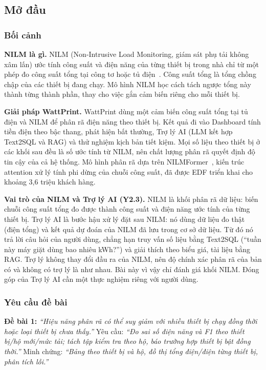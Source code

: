\subsection{Mở đầu}

\subsubsection{Bối cảnh}

\textbf{NILM là gì.} NILM (Non-Intrusive Load Monitoring, giám sát phụ tải không xâm lấn) ước tính công suất và điện năng của từng thiết bị trong nhà chỉ từ một phép đo công suất tổng tại công tơ hoặc tủ điện~\citep{hart1992,zoha2012}. Công suất tổng là tổng chồng chập của các thiết bị đang chạy. Mô hình NILM học cách tách ngược tổng này thành từng thành phần, thay cho việc gắn cảm biến riêng cho mỗi thiết bị.

\textbf{Giải pháp WattPrint.} WattPrint dùng một cảm biến công suất tổng tại tủ điện và NILM để phân rã điện năng theo thiết bị. Kết quả đi vào Dashboard tính tiền điện theo bậc thang, phát hiện bất thường, Trợ lý AI (LLM kết hợp Text2SQL và RAG) và thử nghiệm kịch bản tiết kiệm. Mọi số liệu theo thiết bị ở các khối sau đều là số ước tính từ NILM, nên chất lượng phân rã quyết định độ tin cậy của cả hệ thống. Mô hình phân rã dựa trên NILMFormer~\citep{petralia2025}, kiến trúc attention xử lý tính phi dừng của chuỗi công suất, đã được EDF triển khai cho khoảng 3,6 triệu khách hàng.

\textbf{Vai trò của NILM và Trợ lý AI (Y2.3).} NILM là khối phân rã dữ liệu: biến chuỗi công suất tổng đo được thành công suất và điện năng ước tính của từng thiết bị. Trợ lý AI là bước hậu xử lý đặt sau NILM: nó dùng dữ liệu đo thật (điện tổng) và kết quả dự đoán của NILM đã lưu trong cơ sở dữ liệu. Từ đó nó trả lời câu hỏi của người dùng, chẳng hạn truy vấn số liệu bằng Text2SQL (“tuần này máy giặt dùng bao nhiêu kWh?”) và giải thích theo biểu giá, tài liệu bằng RAG. Trợ lý không thay đổi đầu ra của NILM, nên độ chính xác phân rã của bản có và không có trợ lý là như nhau. Bài này vì vậy chỉ đánh giá khối NILM. Đóng góp của Trợ lý AI cần một thực nghiệm riêng với người dùng.

\subsubsection{Yêu cầu đề bài}

\textbf{Đề bài 1:} \textit{“Hiệu năng phân rã có thể suy giảm với nhiều thiết bị chạy đồng thời hoặc loại thiết bị chưa thấy.”} Yêu cầu: \textit{“Đo sai số điện năng và F1 theo thiết bị/hộ mới/mức tải; tách tập kiểm tra theo hộ, báo trường hợp thiết bị bật đồng thời.”} Minh chứng: \textit{“Bảng theo thiết bị và hộ, đồ thị tổng điện/điện từng thiết bị, phân tích lỗi.”}

